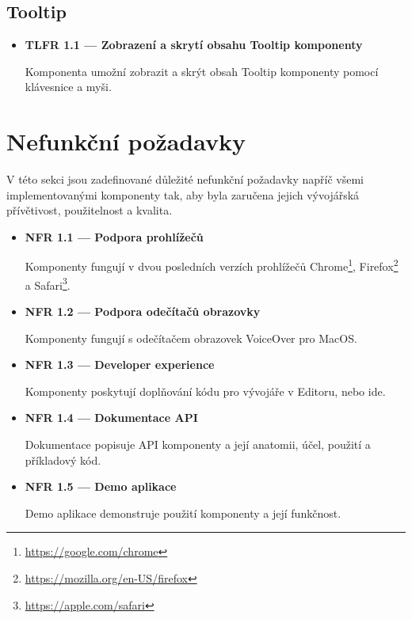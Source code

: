 \subsection{Tooltip}

\begin{itemize}
    \item \textbf{TLFR 1.1 --- Zobrazení a skrytí obsahu Tooltip komponenty}\label{tlfr11}

          Komponenta umožní zobrazit a skrýt obsah Tooltip komponenty pomocí klávesnice a myši.
\end{itemize}

\section{Nefunkční požadavky}

V této sekci jsou zadefinované důležité nefunkční požadavky napříč všemi implementovanými komponenty tak, aby byla zaručena jejich vývojářská přívětivost, použitelnost a kvalita.

\begin{itemize}
    \item \textbf{NFR 1.1 --- Podpora prohlížečů}\label{nfr11}

          Komponenty fungují v dvou posledních verzích prohlížečů Chrome\footnote{\url{https://google.com/chrome}}, Firefox\footnote{\url{https://mozilla.org/en-US/firefox}} a Safari\footnote{\url{https://apple.com/safari}}.

    \item \textbf{NFR 1.2 --- Podpora odečítačů obrazovky}\label{nfr12}

          Komponenty fungují s odečítačem obrazovek VoiceOver pro MacOS.

    \item \textbf{NFR 1.3 --- Developer experience}\label{nfr13}

          Komponenty poskytují doplňování kódu pro vývojáře v Editoru, nebo \gls{ide}.

    \item \textbf{NFR 1.4 --- Dokumentace API}\label{nfr14}

          Dokumentace popisuje API komponenty a její anatomii, účel, použití a příkladový kód.

    \item \textbf{NFR 1.5 --- Demo aplikace}\label{nfr15}

          Demo aplikace demonstruje použití komponenty a její funkčnost.
\end{itemize}

